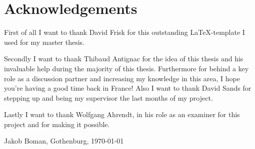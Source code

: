 \thispagestyle{plain}			%
\section*{Acknowledgements}

First of all I want to thank David Frisk for this outstanding \LaTeX-template I used for my master thesis.

Secondly I want to thank Thibaud Antignac for the idea of this thesis and his invaluable help during the majority of this thesis. Furthermore for behind a key role as a discussion partner and increasing my knowledge in this area, I hope you're having a good time back in France! Also I want to thank David Sands for stepping up and being my supervisor the last months of my project. 

Lastly I want to thank Wolfgang Ahrendt, in his role as an examiner for this project and for making it possible. %

\vspace{1.5cm}
\hfill
Jakob Boman, Gothenburg, \today

\newpage				%
\thispagestyle{empty}
\mbox{}